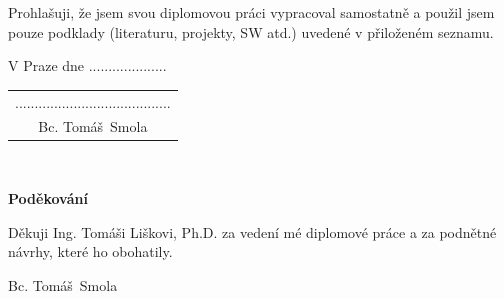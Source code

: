 \documentclass[a4paper,11pt]{report}
\newcommand{\autor}{Bc. Tomáš~Smola}           %
\begin{document}
\vspace{0.5cm} %
Prohlašuji, že jsem svou diplomovou práci vypracoval samostatně a použil jsem pouze podklady
(literaturu, projekty, SW atd.) uvedené v přiloženém seznamu.

\vspace{5mm}V Praze dne ....................\hfill  %
    \begin{tabular}{c}                               %
    ........................................\\       %
    \autor                                           %
    \end{tabular}                                    %

\newpage
\thispagestyle{empty}

~
\vfill %

{\bf Poděkování}

\vspace{5mm} %
Děkuji Ing. Tomáši Liškovi, Ph.D. za vedení mé diplomové práce a za podnětné návrhy, které ho obohatily.

\begin{flushright}
\autor
\end{flushright}  %

\newpage   %
\thispagestyle{empty}   %

\newbox\odstavecbox
\newlength\vyskaodstavce
\newcommand\odstavec[2]{%
    \setbox\odstavecbox=\hbox{%
         \parbox[t]{#1}{#2\vrule width 0pt depth 4pt}}%
    \global\vyskaodstavce=\dp\odstavecbox
    \box\odstavecbox}
\newcommand{\delka}{120mm} %
\end{document}
